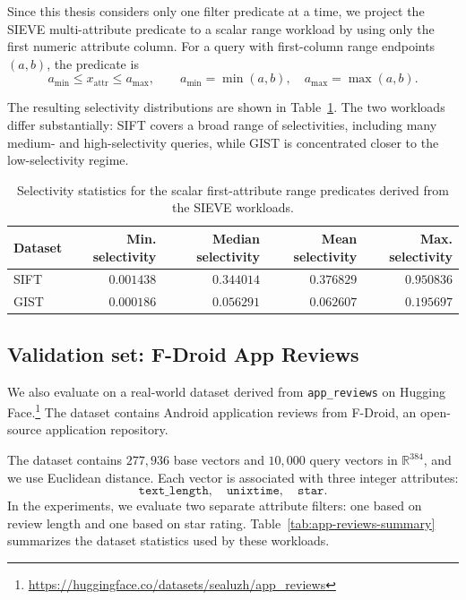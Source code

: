 Since this thesis considers only one filter predicate at a time, we project the SIEVE multi-attribute predicate to a scalar range workload by using only the first numeric attribute column.
For a query with first-column range endpoints \((a,b)\), the predicate is
\[
    a_{\min} \le x_{\mathrm{attr}} \le a_{\max},
    \qquad
    a_{\min}=\min(a,b),\quad a_{\max}=\max(a,b).
\]

The resulting selectivity distributions are shown in Table~\ref{tab:sieve-selectivity-summary}.
The two workloads differ substantially: \textsc{SIFT} covers a broad range of selectivities, including many medium- and high-selectivity queries, while \textsc{GIST} is concentrated closer to the low-selectivity regime.

\begin{table}[H]
    \centering
    \renewcommand{\arraystretch}{1.15}
    \begin{tabular}{lrrrr}
        \toprule
        Dataset & Min. selectivity & Median selectivity & Mean selectivity & Max. selectivity \\
        \midrule
        \textsc{SIFT} & \(0.001438\) & \(0.344014\) & \(0.376829\) & \(0.950836\) \\
        \textsc{GIST} & \(0.000186\) & \(0.056291\) & \(0.062607\) & \(0.195697\) \\
        \bottomrule
    \end{tabular}
    \caption{Selectivity statistics for the scalar first-attribute range predicates derived from the SIEVE workloads.}
    \label{tab:sieve-selectivity-summary}
\end{table}

\subsection{Validation set: F-Droid App Reviews}
\label{subsec:fdroid}

We also evaluate on a real-world dataset derived from
\texttt{app\_reviews} on Hugging Face.\footnote{\url{https://huggingface.co/datasets/sealuzh/app_reviews}}
The dataset contains Android application reviews from F-Droid, an open-source
application repository.

The dataset contains \(277{,}936\) base vectors and \(10{,}000\) query vectors
in \(\mathbb{R}^{384}\), and we use Euclidean distance. Each vector is associated
with three integer attributes:
\[
    \texttt{text\_length},\quad \texttt{unixtime},\quad \texttt{star}.
\]
In the experiments, we evaluate two separate attribute filters: one based on
review length and one based on star rating. Table~\ref{tab:app-reviews-summary}
summarizes the dataset statistics used by these workloads.

